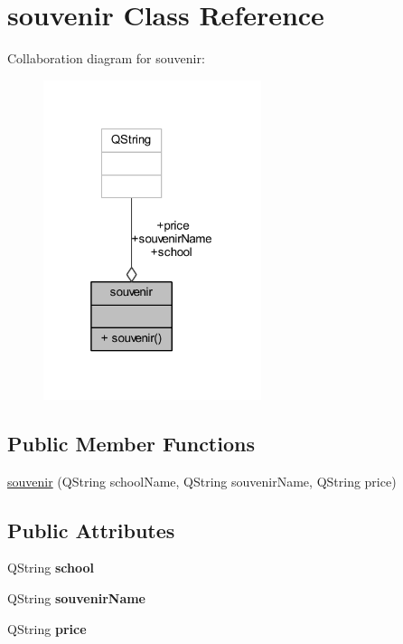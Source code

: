 \hypertarget{classsouvenir}{}\section{souvenir Class Reference}
\label{classsouvenir}


Collaboration diagram for souvenir\+:\nopagebreak
\begin{figure}[H]
\begin{center}
\leavevmode
\includegraphics[width=181pt]{classsouvenir__coll__graph}
\end{center}
\end{figure}
\subsection*{Public Member Functions}
\begin{DoxyCompactItemize}
\item 
\hyperlink{classsouvenir_a53eb7933555c5ba83d336c5b21475cc2}{souvenir} (Q\+String school\+Name, Q\+String souvenir\+Name, Q\+String price)
\end{DoxyCompactItemize}
\subsection*{Public Attributes}
\begin{DoxyCompactItemize}
\item 
\mbox{\label{classsouvenir_a5c5db004874f514b60fba59b3a6e8d2d}} 
Q\+String {\bfseries school}
\item 
\mbox{\label{classsouvenir_af5e9cd9f582373994b70065f64160a97}} 
Q\+String {\bfseries souvenir\+Name}
\item 
\mbox{\label{classsouvenir_a79e0d7bf9536730792ad23f3f2a0f791}} 
Q\+String {\bfseries price}
\end{DoxyCompactItemize}


